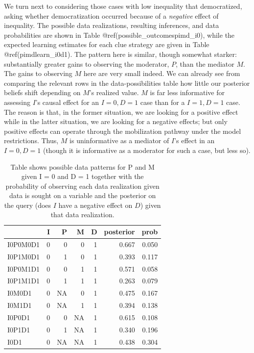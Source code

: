\documentclass[12pt,]{book}
\begin{document}
We turn next to considering those cases with low inequality that democratized, asking whether democratization occurred because of a \emph{negative} effect of inequality. The possible data realizations, resulting inferences, and data probabilities are shown in Table @ref(possible\_outcomespimd\_i0), while the expected learning estimates for each clue strategy are given in Table @ref(pimdlearn\_i0d1). The pattern here is similar, though somewhat starker: substantially greater gains to observing the moderator, \(P\), than the mediator \(M\). The gains to observing \(M\) here are very small indeed. We can already see from comparing the relevant rows in the data-possibilities table how little our posterior beliefs shift depending on \(M\)'s realized value. \(M\) is far less informative for assessing \(I\)'s causal effect for an \(I=0, D=1\) case than for a \(I=1, D=1\) case. The reason is that, in the former situation, we are looking for a positive effect while in the latter situation, we are looking for a negative effects; but only positive effects can operate through the mobilization pathway under the model restrictions. Thus, \(M\) is uninformative as a mediator of \(I\)'s effect in an \(I=0, D=1\) (though it is informative as a moderator for such a case, but less so).

\begin{table}[t]

\caption{\label{tab:unnamed-chunk-67}\label{possible_outcomespimd_i0} Table shows possible data patterns for P and M given I = 0 and D = 1 together with the probability of observing each data realization given data is sought on a variable and the posterior on the query (does $I$ have a negative effect on $D$) given that data realization.}
\centering
\begin{tabular}{l|r|r|r|r|r|r}
\hline
  & I & P & M & D & posterior & prob\\
\hline
I0P0M0D1 & 0 & 0 & 0 & 1 & 0.667 & 0.050\\
\hline
I0P1M0D1 & 0 & 1 & 0 & 1 & 0.393 & 0.117\\
\hline
I0P0M1D1 & 0 & 0 & 1 & 1 & 0.571 & 0.058\\
\hline
I0P1M1D1 & 0 & 1 & 1 & 1 & 0.263 & 0.079\\
\hline
I0M0D1 & 0 & NA & 0 & 1 & 0.475 & 0.167\\
\hline
I0M1D1 & 0 & NA & 1 & 1 & 0.394 & 0.138\\
\hline
I0P0D1 & 0 & 0 & NA & 1 & 0.615 & 0.108\\
\hline
I0P1D1 & 0 & 1 & NA & 1 & 0.340 & 0.196\\
\hline
I0D1 & 0 & NA & NA & 1 & 0.438 & 0.304\\
\hline
\end{tabular}
\end{table}
\end{document}
